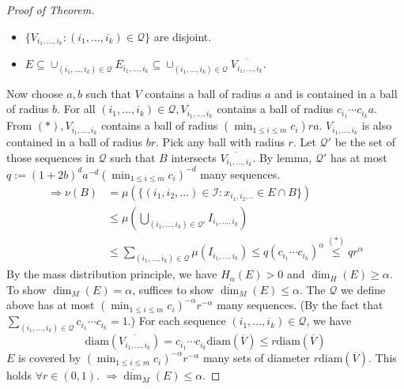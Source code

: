 \documentclass{article}
\theoremstyle{definition}
\newenvironment{proofs}[1][\proofname]{%
  \begin{proof}[#1]$ $\par\nobreak\ignorespaces
}{%
  \end{proof}
}
\newcommand{\I}{\mathcal I}
\newcommand{\Q}{\mathcal Q}
\newcommand{\Ra}{\Rightarrow}
\newcommand{\diam}{\text{diam}}
\begin{document}
\begin{proofs}[Proof of Theorem]
\begin{itemize}
		\item $\{V_{i_1, ..., i_k}: (i_1, ..., i_k) \in \Q\}$ are disjoint.

		\item $E \subseteq \cup_{(i_1, ..., i_k) \in \Q} E_{i_1, ..., i_k} \subseteq \cup_{(i_1, ..., i_k) \in \Q} \overline{V_{i_1, ..., i_k}}$.
	\end{itemize}

	Now choose $a, b$ such that $V$ contains a ball of radius $a$ and is contained in a ball of radius $b$.
	For all $(i_1, ..., i_k) \in \Q, V_{i_1, ..., i_k}$ contains a ball of radius $c_{i_1} \cdots c_{i_k} a$.
	From $(*), V_{i_1, ..., i_k}$ contains a ball of radius $(\min_{1 \leq i \leq m} c_i) ra$.
	$V_{i_1, ..., i_k}$ is also contained in a ball of radius $b r$.
	Pick any ball with radius $r$.
	Let $\Q'$ be the set of those sequences in $\Q$ such that $B$ intersects $\overline{V_{i_1, ..., i_k}}$.
	By lemma, $\Q'$ has at most $q := (1 + 2b)^d a^{-d} (\min_{1 \leq i \leq m} c_i)^{-d}$ many sequences.
	\[
		\begin{split}
			\Ra \nu(B) &= \mu(\{(i_1, i_2, ...) \in \I: x_{i_1, i_2, ..} \in E \cap B\})\\
			&\leq \mu \left( \bigcup_{(i_1, ..., i_k) \in \Q'} I_{i_1, ..., i_k}\right)\\
			&\leq \sum_{(i_1, ..., i_k) \in \Q} \mu(I_{i_1, ..., i_k}) \leq q(c_{i_1} \cdots c_{i_k})^\alpha \stackrel{(*)}{\leq} q r^\alpha
		\end{split}
	\]
	By the mass distribution principle, we have $H_\alpha(E) > 0$ and $\dim_H(E) \geq \alpha$.
	To show $\dim_M(E) = \alpha$, suffices to show $\overline{\dim}_M(E) \leq \alpha$.
	The $\Q$ we define above has at most $(\min_{1 \leq i \leq m} c_i)^{-\alpha} r^{-\alpha}$ many sequences. 
	(By the fact that $\sum_{(i_1, ..., i_k) \in \Q} c_{i_1} \cdots c_{i_k} = 1$.)
	For each sequence $(i_1, ..., i_k) \in \Q$, we have
	\[
		\diam(\overline{V_{i_1, ..., i_k}}) = c_{i_1} \cdots c_{i_k} \diam(\overline{V}) \leq r \diam(\overline{V})
	\]
	$E$ is covered by $(\min_{1 \leq i \leq m} c_i)^{-\alpha} r^{-\alpha}$ many sets of diameter $r \diam(\overline{V})$.
	This holds $\forall r \in (0, 1)$.
	$\Ra \overline{\dim}_M(E) \leq \alpha$.
\end{proofs}
\end{document}
